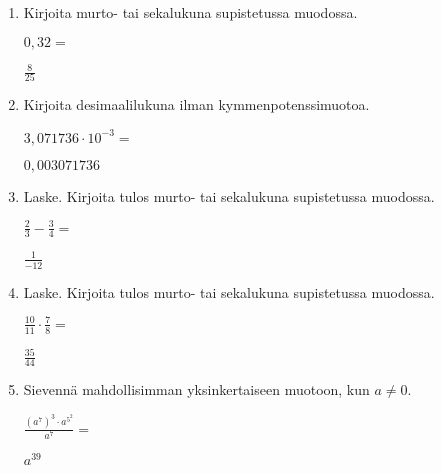 \documentclass[finnish, a4paper, 12pt]{article}
\begin{document}
	\begin{enumerate}[leftmargin=*]
		\setlength\itemsep{1em}
		
		\item %
		Kirjoita murto- tai sekalukuna supistetussa muodossa. 
		
		\(
		0{,}32 = 
		\) %
		
		\begin{version:withAnswers}
		\( \frac{8}{25} \)
		\end{version:withAnswers}

		\vspace{8pt}
		
		\item %
		Kirjoita desimaalilukuna ilman kymmenpotenssimuotoa. 
		
		\(
		3{,}071736\cdot 10^{-3} = 
		\) %
		\begin{version:withAnswers}
		\( 0,003071736 \)
		\end{version:withAnswers}	
		\vspace{8pt}
		
		\item %
		Laske. Kirjoita tulos murto- tai sekalukuna supistetussa muodossa.
		
		\(
		\displaystyle
		\frac{2}{3}-\frac{3}{4} = 
		\) %
		\begin{version:withAnswers}
		\( \frac{1}{-12} \)
		\end{version:withAnswers}	
		
		\vspace{8pt}
		
		\item %
		Laske. Kirjoita tulos murto- tai sekalukuna supistetussa muodossa.
		
		\(
		\displaystyle
		\frac{10}{11}\cdot\frac{7}{8} = 
		\) %
		\begin{version:withAnswers}
		\( \frac{35}{44} \)
		\end{version:withAnswers}
		
		\vspace{8pt}
		
		\item %
		Sievennä mahdollisimman yksinkertaiseen muotoon, kun \(a \not = 0\). 
		
		\(
		\displaystyle
		\frac{\left(a^7\right)^3 \cdot a^{5^2}}{a^7} =
		\phantom{mmmmmmmmmmmmmmm}
		\) %
		\begin{version:withAnswers}
		\(  a^{39} \)
		\end{version:withAnswers}
		

\end{enumerate}
\end{document}
